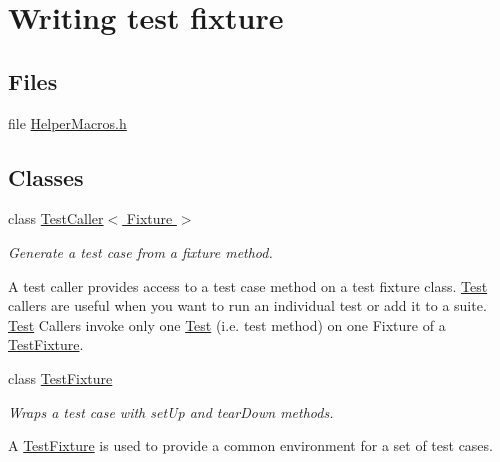 \hypertarget{group___writing_test_fixture}{}\section{Writing test fixture}
\label{group___writing_test_fixture}
\subsection*{Files}
\begin{DoxyCompactItemize}
\item 
file \hyperlink{_helper_macros_8h}{Helper\+Macros.\+h}
\end{DoxyCompactItemize}
\subsection*{Classes}
\begin{DoxyCompactItemize}
\item 
class \hyperlink{class_test_caller}{Test\+Caller$<$ Fixture $>$}
\begin{DoxyCompactList}\small\item\em Generate a test case from a fixture method.

A test caller provides access to a test case method on a test fixture class. \hyperlink{class_test}{Test} callers are useful when you want to run an individual test or add it to a suite. \hyperlink{class_test}{Test} Callers invoke only one \hyperlink{class_test}{Test} (i.\+e. test method) on one Fixture of a \hyperlink{class_test_fixture}{Test\+Fixture}. \end{DoxyCompactList}\item 
class \hyperlink{class_test_fixture}{Test\+Fixture}
\begin{DoxyCompactList}\small\item\em Wraps a test case with set\+Up and tear\+Down methods.

A \hyperlink{class_test_fixture}{Test\+Fixture} is used to provide a common environment for a set of test cases. \end{DoxyCompactList}\end{DoxyCompactItemize}
